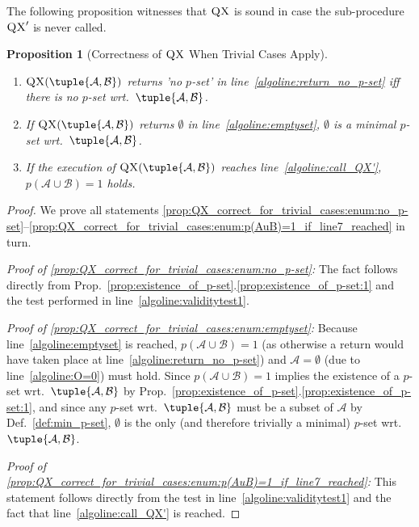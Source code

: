 \documentclass[]{elsarticle}
\newcommand{\scQX}{{\textsc{QX}}}
\newcommand{\ma}{\mathcal{A}}
\newcommand{\mb}{\mathcal{B}}
\newtheorem{proposition}{Proposition}[]{}
\begin{document}
	\noindent The following proposition witnesses that $\scQX$ is sound in case the sub-procedure $\scQX'$ is never called.
	\begin{proposition}[Correctness of $\scQX$ When Trivial Cases Apply]\label{prop:QX_correct_for_trivial_cases}
		\leavevmode
		\begin{enumerate}[noitemsep,label=(\arabic*)]
			\item \label{prop:QX_correct_for_trivial_cases:enum:no_p-set} $\scQX(\tuple{\ma,\mb})$ returns 'no $p$-set' in line~\ref{algoline:return_no_p-set} iff there is no $p$-set wrt.\ $\tuple{\ma,\mb}$.
			\item \label{prop:QX_correct_for_trivial_cases:enum:emptyset} If $\scQX(\tuple{\ma,\mb})$ returns $\emptyset$ in line~\ref{algoline:emptyset}, $\emptyset$ is a minimal $p$-set wrt.\ $\tuple{\ma,\mb}$.
			\item \label{prop:QX_correct_for_trivial_cases:enum:p(AuB)=1_if_line7_reached} If the execution of $\scQX(\tuple{\ma,\mb})$ reaches line~\ref{algoline:call_QX'}, $p(\ma\cup\mb)=1$ holds.
		\end{enumerate}
	\end{proposition}
	\begin{proof}
		We prove all statements \ref{prop:QX_correct_for_trivial_cases:enum:no_p-set}--\ref{prop:QX_correct_for_trivial_cases:enum:p(AuB)=1_if_line7_reached} in turn.\vspace{5pt}
		
		\noindent\emph{Proof of \ref{prop:QX_correct_for_trivial_cases:enum:no_p-set}:}  
		The fact follows directly from Prop.~\ref{prop:existence_of_p-set}.\ref{prop:existence_of_p-set:1} and the test performed in line~\ref{algoline:validitytest1}.\vspace{5pt}
		
		\noindent\emph{Proof of \ref{prop:QX_correct_for_trivial_cases:enum:emptyset}:}  
		Because line~\ref{algoline:emptyset} is reached, $p(\ma\cup\mb)=1$ (as otherwise a return would have taken place at line~\ref{algoline:return_no_p-set}) and $\ma = \emptyset$ (due to line~\ref{algoline:O=0}) must hold. Since $p(\ma\cup\mb)=1$ implies the existence of a $p$-set wrt.\ $\tuple{\ma,\mb}$ by Prop.~\ref{prop:existence_of_p-set}.\ref{prop:existence_of_p-set:1}, and since any $p$-set wrt.\ $\tuple{\ma,\mb}$ must be a subset of $\ma$ by Def.~\ref{def:min_p-set}, $\emptyset$ is the only (and therefore trivially a minimal) $p$-set wrt.\ $\tuple{\ma,\mb}$.\vspace{5pt}
		
		\noindent\emph{Proof of \ref{prop:QX_correct_for_trivial_cases:enum:p(AuB)=1_if_line7_reached}:}  
		This statement follows directly from the test in line~\ref{algoline:validitytest1} and the fact that line~\ref{algoline:call_QX'} is reached.
	\end{proof}
\end{document}
